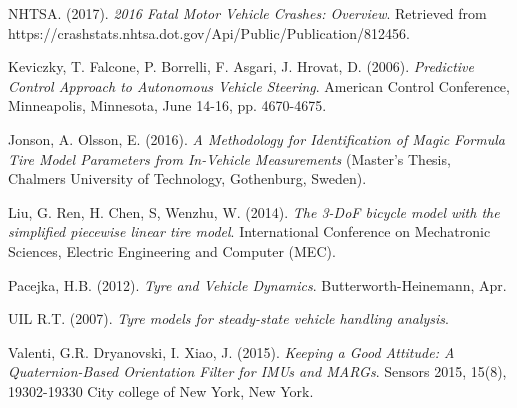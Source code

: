 \begin{thebibliography}{9}


  NHTSA. (2017).
\textit{2016 Fatal Motor Vehicle Crashes: Overview}.
  Retrieved from https://crashstats.nhtsa.dot.gov/Api/Public/Publication/812456.


 Keviczky, T. Falcone, P. Borrelli, F. Asgari, J. Hrovat, D. (2006).
\textit{Predictive Control Approach to Autonomous Vehicle Steering}.
American Control Conference, Minneapolis, Minnesota, June 14-16, pp. 4670-4675.


Jonson, A. Olsson, E. (2016).
\textit{A Methodology for Identification of
Magic Formula Tire Model Parameters
from In-Vehicle Measurements} (Master's Thesis, Chalmers University of Technology, Gothenburg, Sweden). 


Liu, G. Ren, H. Chen, S, Wenzhu, W. (2014).
\textit{The 3-DoF bicycle model with the simplified piecewise linear tire model}.
International Conference on Mechatronic Sciences, Electric Engineering and Computer (MEC).


Pacejka, H.B. (2012).
\textit{Tyre and Vehicle Dynamics}.
Butterworth-Heinemann, Apr. 


UIL R.T. (2007).
\textit{Tyre models for steady-state vehicle handling analysis}.
  
  
Valenti, G.R. Dryanovski, I. Xiao, J. (2015).
\textit{Keeping a Good Attitude: A Quaternion-Based Orientation Filter for IMUs and MARGs}.
Sensors 2015, 15(8), 19302-19330
City college of New York, New York.









 


\end{thebibliography}


